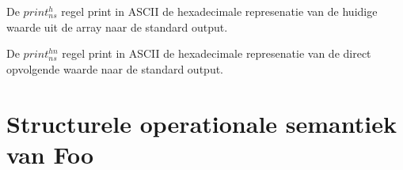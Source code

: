 \documentclass[11pt]{article}
\begin{document}
De $print^h_{ns}$ regel print in ASCII de hexadecimale represenatie van de huidige waarde uit de array naar de standard output.
\begin{prooftree}
\end{prooftree}

De $print^{hn}_{ns}$ regel print in ASCII de hexadecimale represenatie van de direct opvolgende waarde naar de standard output.
\begin{prooftree}
\end{prooftree}



\section{Structurele operationale semantiek van Foo}

%
\end{document}
